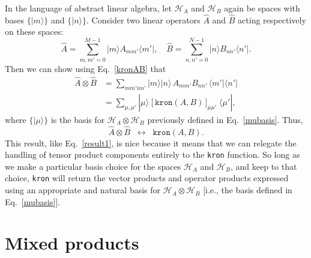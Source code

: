 \documentclass[pra,12pt]{revtex4}
\begin{document}
In the language of abstract linear algebra, let $\mathscr{H}_A$ and
$\mathscr{H}_B$ again be spaces with bases $\{|m\rangle\}$ and
$\{|n\rangle\}$.  Consider two linear operators $\hat{A}$ and
$\hat{B}$ acting respectively on these spaces:
\begin{equation}
  \hat{A} = \sum_{m,m'=0}^{M-1}  |m\rangle A_{mm'} \langle m'|, \quad \hat{B} = \sum_{n,n'=0}^{N-1} |n\rangle B_{nn'}\langle n'|.
\end{equation}
Then we can show using Eq.~\eqref{kronAB} that
\begin{align}
  \hat{A}\otimes\hat{B} &=
  \sum_{mm'nn'} |m\rangle|n\rangle\,A_{mm'} B_{nn'}\,\langle m'| \langle n'| \\
  &= \sum_{\mu,\mu'} |\mu\rangle \;
  \big[\,\texttt{kron}(A,B)\,\big]_{\mu\mu'} \; \langle\mu'|,
\end{align}
where $\big\{|\mu\rangle\big\}$ is the basis for
$\mathscr{H}_A\otimes\mathscr{H}_B$ previously defined in
Eq.~\eqref{mubasis}.  Thus,
\begin{equation}
  \hat{A}\otimes\hat{B} \;\;\leftrightarrow\;\;
  \texttt{kron}(A,B).
  \label{result2}
\end{equation}
This result, like Eq.~\eqref{result1}, is nice because it means that
we can relegate the handling of tensor product components entirely to
the \texttt{kron} function.  So long as we make a particular basis
choice for the spaces $\mathscr{H}_A$ and $\mathscr{H}_B$, and keep to
that choice, \texttt{kron} will return the vector products and
operator products expressed using an appropriate and natural basis for
$\mathscr{H}_A\otimes\mathscr{H}_B$ [i.e., the basis defined in
  Eq.~\eqref{mubasis}].

\section{Mixed products}
\end{document}
